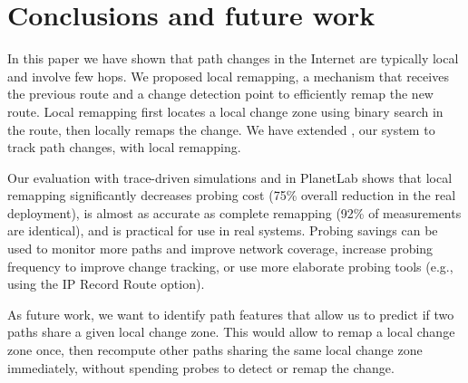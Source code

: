 \section{Conclusions and future work}
\label{sec:conc}

In this paper we have shown that path changes in the Internet are
typically local and involve few hops.  We proposed local remapping, a
mechanism that receives the previous route and a change detection point
to efficiently remap the new route.  Local remapping first locates a
local change zone using binary search in the route, then locally remaps
the change.  We have extended \dtrack{}, our system to track path
changes, with local remapping.

Our evaluation with trace-driven simulations and in PlanetLab shows that
local remapping significantly decreases probing cost (75\% overall
reduction in the real deployment), is almost as accurate as complete
remapping (92\% of measurements are identical), and is practical for use
in real systems.  Probing savings can be used to monitor more paths and
improve network coverage, increase probing frequency to improve change
tracking, or use more elaborate probing tools (e.g., using the IP Record
Route option).

As future work, we want to identify path features that allow us to
predict if two paths share a given local change zone.  This would allow
\dtrack{} to remap a local change zone once, then recompute other paths
sharing the same local change zone immediately, without spending probes
to detect or remap the change.


\vfill\pagebreak


%
%
%
%
%
%
%

